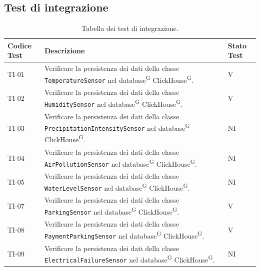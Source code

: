 \documentclass[8pt]{article}
\newcommand{\glossterm}[1]{#1\textsuperscript{G}} %
\begin{document}
\subsection{Test di integrazione}
\renewcommand{\arraystretch}{2.5}
\begin{longtable}{|>{\centering}p{2cm}|>{\RaggedRight}m{12cm}|>{\centering\arraybackslash}p{2cm}|}
    \hline
    \rowcolor{white}
    \textbf{Codice Test} & \textbf{Descrizione} & \textbf{Stato Test} \\
    \hline
    \endfirsthead 
    \rowcolor{white}
    \caption{Tabella dei test di integrazione.} 
    \label{table:Tabella dei test di integrazione}
    \endlastfoot 
        
    TI-01 & Verificare la persistenza dei dati della classe \verb|TemperatureSensor| nel \glossterm{database} \glossterm{ClickHouse}.  & V \\
    \hline

    TI-02 & Verificare la persistenza dei dati della classe \verb|HumiditySensor| nel \glossterm{database} \glossterm{ClickHouse}.  & V \\
    \hline
    
    TI-03 & Verificare la persistenza dei dati della classe \verb|PrecipitationIntensitySensor| nel \glossterm{database} \glossterm{ClickHouse}. & NI \\
    \hline

    TI-04 & Verificare la persistenza dei dati della classe \verb|AirPollutionSensor| nel \glossterm{database} \glossterm{ClickHouse}. & NI \\
    \hline

    TI-05 & Verificare la persistenza dei dati della classe \verb|WaterLevelSensor| nel \glossterm{database} \glossterm{ClickHouse}. & NI \\
    \hline

    TI-07 & Verificare la persistenza dei dati della classe \verb|ParkingSensor| nel \glossterm{database} \glossterm{ClickHouse}. & V \\
    \hline 

    TI-08 & Verificare la persistenza dei dati della classe \verb|PaymentParkingSensor| nel \glossterm{database} \glossterm{ClickHouse}. & V \\
    \hline
    
    TI-09 & Verificare la persistenza dei dati della classe \verb|ElectricalFailureSensor| nel \glossterm{database} \glossterm{ClickHouse}. & NI \\
    \hline


\end{longtable}
\end{document}
